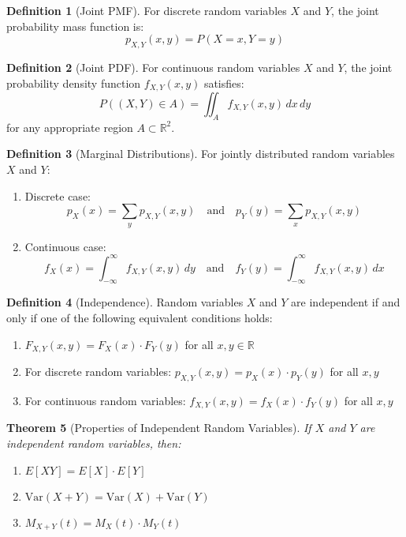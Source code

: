 \documentclass[12pt,a4paper]{article}
\theoremstyle{plain}
\newtheorem{theorem}{Theorem}[section]
\theoremstyle{definition}
\newtheorem{definition}[theorem]{Definition}
\begin{document}
\begin{definition}[Joint PMF]
For discrete random variables $X$ and $Y$, the joint probability mass function is:
\begin{equation}
p_{X,Y}(x,y) = P(X = x, Y = y)
\end{equation}
\end{definition}

\begin{definition}[Joint PDF]
For continuous random variables $X$ and $Y$, the joint probability density function $f_{X,Y}(x,y)$ satisfies:
\begin{equation}
P((X,Y) \in A) = \iint_A f_{X,Y}(x,y) \, dx \, dy
\end{equation}
for any appropriate region $A \subset \mathbb{R}^2$.
\end{definition}

\begin{definition}[Marginal Distributions]
For jointly distributed random variables $X$ and $Y$:
\begin{enumerate}[label=(\roman*)]
\item Discrete case:
\begin{equation}
p_X(x) = \sum_y p_{X,Y}(x,y) \quad \text{and} \quad p_Y(y) = \sum_x p_{X,Y}(x,y)
\end{equation}
\item Continuous case:
\begin{equation}
f_X(x) = \int_{-\infty}^{\infty} f_{X,Y}(x,y) \, dy \quad \text{and} \quad f_Y(y) = \int_{-\infty}^{\infty} f_{X,Y}(x,y) \, dx
\end{equation}
\end{enumerate}
\end{definition}

\begin{definition}[Independence]
Random variables $X$ and $Y$ are independent if and only if one of the following equivalent conditions holds:
\begin{enumerate}[label=(\roman*)]
\item $F_{X,Y}(x,y) = F_X(x) \cdot F_Y(y)$ for all $x, y \in \mathbb{R}$
\item For discrete random variables: $p_{X,Y}(x,y) = p_X(x) \cdot p_Y(y)$ for all $x, y$
\item For continuous random variables: $f_{X,Y}(x,y) = f_X(x) \cdot f_Y(y)$ for all $x, y$
\end{enumerate}
\end{definition}

\begin{theorem}[Properties of Independent Random Variables]
If $X$ and $Y$ are independent random variables, then:
\begin{enumerate}[label=(\roman*)]
\item $E[XY] = E[X] \cdot E[Y]$
\item $\text{Var}(X + Y) = \text{Var}(X) + \text{Var}(Y)$
\item $M_{X+Y}(t) = M_X(t) \cdot M_Y(t)$
\end{enumerate}
\end{theorem}
\end{document}
